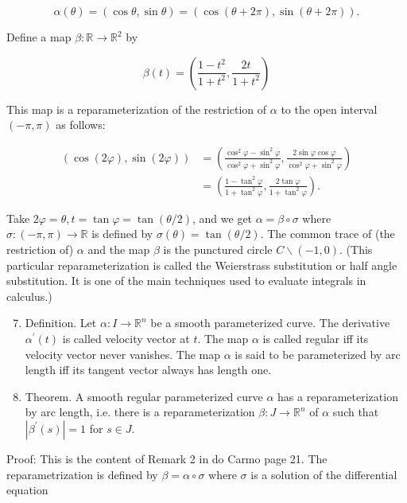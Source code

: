 \documentclass[10pt]{article}
\begin{document}
$$
\alpha(\theta)=(\cos \theta, \sin \theta)=(\cos (\theta+2 \pi), \sin (\theta+2 \pi)) .
$$

Define a map $\beta: \mathbb{R} \rightarrow \mathbb{R}^{2}$ by

$$
\beta(t)=\left(\frac{1-t^{2}}{1+t^{2}}, \frac{2 t}{1+t^{2}}\right)
$$

This map is a reparameterization of the restriction of $\alpha$ to the open interval $(-\pi, \pi)$ as follows:

$$
\begin{aligned}
(\cos (2 \varphi), \sin (2 \varphi)) & =\left(\frac{\cos ^{2} \varphi-\sin ^{2} \varphi}{\cos ^{2} \varphi+\sin ^{2} \varphi}, \frac{2 \sin \varphi \cos \varphi}{\cos ^{2} \varphi+\sin ^{2} \varphi}\right) \\
& =\left(\frac{1-\tan ^{2} \varphi}{1+\tan ^{2} \varphi}, \frac{2 \tan \varphi}{1+\tan ^{2} \varphi}\right) .
\end{aligned}
$$

Take $2 \varphi=\theta, t=\tan \varphi=\tan (\theta / 2)$, and we get $\alpha=\beta \circ \sigma$ where $\sigma:(-\pi, \pi) \rightarrow \mathbb{R}$ is defined by $\sigma(\theta)=\tan (\theta / 2)$. The common trace of (the restriction of) $\alpha$ and the map $\beta$ is the punctured circle $C \backslash(-1,0)$. (This particular reparameterization is called the Weierstrass substitution or half angle substitution. It is one of the main techniques used to evaluate integrals in calculus.)

\begin{enumerate}
  \setcounter{enumi}{6}
  \item Definition. Let $\alpha: I \rightarrow \mathbb{R}^{n}$ be a smooth parameterized curve. The derivative $\alpha^{\prime}(t)$ is called velocity vector at $t$. The map $\alpha$ is called regular iff its velocity vector never vanishes. The map $\alpha$ is said to be parameterized by arc length iff its tangent vector always has length one.

  \item Theorem. A smooth regular parameterized curve $\alpha$ has a reparameterization by arc length, i.e. there is a reparameterization $\beta: J \rightarrow \mathbb{R}^{n}$ of $\alpha$ such that $\left|\beta^{\prime}(s)\right|=1$ for $s \in J$.

\end{enumerate}

Proof: This is the content of Remark 2 in do Carmo page 21. The reparametrization is defined by $\beta=\alpha \circ \sigma$ where $\sigma$ is a solution of the differential equation
\end{document}
